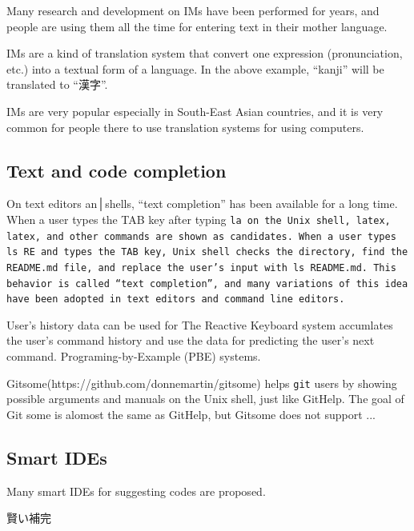\documentclass{sigchi}
\def\GH{\textsf{GitHelp}}
\begin{document}
Many research and development on IMs have been performed for years, and
people are using them all the time for entering text in their mother language.

IMs are a kind of translation system that convert one
expression (pronunciation, etc.) into a textual form of a language.
In the above example, ``kanji'' will be translated to ``漢字''.

IMs are very popular especially in South-East Asian countries, and
it is very common for people there to 
use translation systems for using computers.

\subsection{Text and code completion}

On text editors an│shells,
``text completion'' has been available for a long time.
%
When a user types the TAB key after typing \tt{la} on the Unix shell,
\tt{latex}, \tt{latex}, and other commands are shown as candidates.
When a user types \tt{ls RE} and types the TAB key,
Unix shell checks the directory, find the \texttt{README.md} file, and
replace the user's input with \tt{ls README.md}.
This behavior is called ``text completion'', and many variations of
this idea have been adopted in text editors and command line editors.

User's history data can be used for 
The Reactive Keyboard system\cite{ReactiveKeyboard}
accumlates the user's command history and use the data
for predicting the user's next command.
Programing-by-Example (PBE) systems\cite{Cypher}\cite{Lieberman}.

Gitsome(https://github.com/donnemartin/gitsome)
helps \texttt{git} users by
showing possible arguments and manuals on the Unix shell,
just like {\GH}.
The goal of Git some is alomost the same as {\GH}, but
Gitsome does not support ...

\subsection{Smart IDEs}

Many smart IDEs for suggesting codes are proposed.

賢い補完
\cite{Little:2006:TKC:1166253.1166275}
\end{document}
